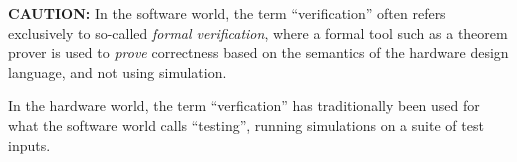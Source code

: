 \begin{frame}[fragile]
\begin{center}
\begin{minipage}{0.9\textwidth}
    \vspace*{8ex}

    {\tiny {\bf CAUTION:} In the software world, the term ``verification''
    often refers exclusively to so-called \emph{formal verification},
    where a formal tool such as a theorem prover is used to
    \emph{prove} correctness based on the semantics of the hardware
    design language, and not using simulation.}

    {\tiny In the hardware world, the term ``verfication'' has
    traditionally been used for what the software world calls
    ``testing'', {\ie} running simulations on a suite of test inputs.}
 \end{minipage}
\end{center}

\end{frame}


